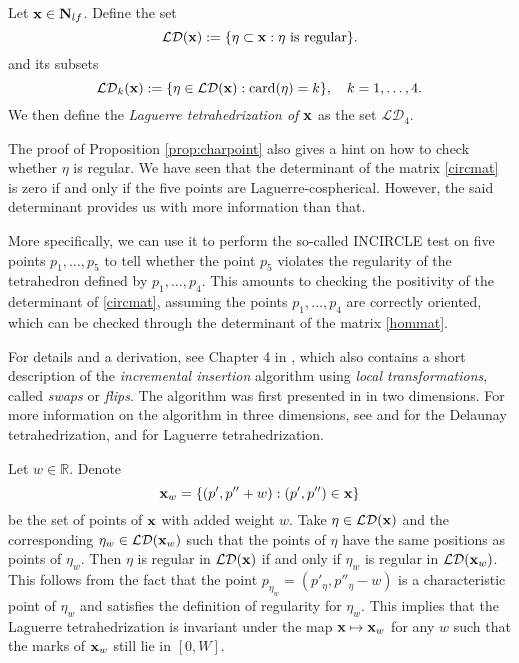 \begin{definition}\label{def:Laguerre}
	Let ${\mathbf{x}} \in \mathbf N_{lf}$. Define the set 
	$$\mathcal {LD}({\mathbf{x}}) := \{\eta\subset {\mathbf{x}}: \eta \text{ is regular}\}.$$
	and its subsets
	$$\mathcal {LD}_k({\mathbf{x}}) := \{\eta \in \mathcal {LD}({\mathbf{x}}): \mathrm{card}(\eta)=k \},\quad k = 1,\dots,4.$$
	We then define the \textit{Laguerre tetrahedrization of ${\mathbf{x}}$} as the set $\mathcal {LD}_4$. 
\end{definition}



\begin{remark}\label{r:construct}
	The proof of Proposition \ref{prop:charpoint} also gives a hint on how to check whether $\eta$ is regular. We have seen that the determinant of the matrix \eqref{circmat} is zero if and only if the five points are Laguerre-cospherical. However, the said determinant provides us with more information than that. 
	
	More specifically, we can use it to perform the so-called INCIRCLE test on five points $p_1,\dots, p_5$ to tell whether the point $p_5$ violates the regularity of the tetrahedron defined by $p_1,\dots, p_4$. This amounts to checking the positivity of the determinant of \eqref{circmat}, assuming the points $p_1,\dots, p_4$ are correctly oriented, which can be checked through the determinant of the matrix \eqref{hommat}. 
	
	For details and a derivation, see Chapter 4 in \cite{Gavrilova}, which also contains a short description of the \textit{incremental insertion} algorithm using \textit{local transformations}, called \textit{swaps} or \textit{flips}. The algorithm was first presented in \cite{Lawson72} in two dimensions. For more information on the algorithm in three dimensions, see \cite{Joe89} and \cite{Joe91} for the Delaunay tetrahedrization, and \cite{Edelsbrunner1996} for Laguerre tetrahedrization.
\end{remark}



\begin{remark}\label{rem:invariance}
	Let $w\in \mathbb R$. Denote 
	$${\mathbf{x}}_w = \{(p',p''+w): (p',p'')\in{\mathbf{x}}\}$$ be the set of points of ${\mathbf{x}}$ with added weight $w$. Take $\eta \in \mathcal {LD}({\mathbf{x}})$ and the corresponding $\eta_w \in \mathcal {LD}({\mathbf{x}}_w)$ such that the points of $\eta$ have the same positions as points of $\eta_w$. Then $\eta$ is regular in $\mathcal {LD}({\mathbf{x}})$ if and only if $\eta_w$ is  regular in $\mathcal {LD}({\mathbf{x}}_w)$. This follows from the fact that the point $p_{\eta_w} = (p'_{\eta}, p''_{\eta} -w)$ is a characteristic point of $\eta_w$ and satisfies the definition of regularity for $\eta_w$. This implies that the Laguerre tetrahedrization is invariant under the map ${\mathbf{x}} \mapsto {\mathbf{x}}_w$ for any $w$ such that the marks of ${\mathbf{x}}_w$ still lie in $[0,W]$.
\end{remark}

